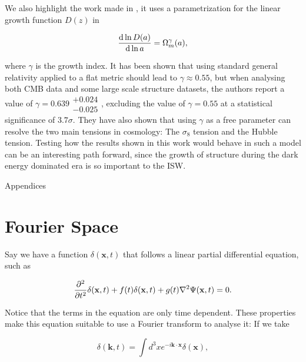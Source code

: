\documentclass[openany,a4paper,12pt,oneside]{book}
\begin{document}
\begin{spacing}{1.5}
We also highlight the work made in \cite{	growth_constraint}, it uses a parametrization for the linear growth function $D(z)$ in \cite{growth_model}

\begin{equation}\label{growth_func_new}
	\dv{\ln{D(a)}}{\ln{a}}=\Omega_m^\gamma (a),
\end{equation}

\noindent where $\gamma$ is the growth index. It has been shown that using standard general relativity applied to a flat metric should lead to $\gamma\approx 0.55$, but when analysing both CMB data and some large scale structure datasets, the authors report a value of $\gamma=0.639\substack{+0.024 \\ -0.025}$, excluding the value of $\gamma=0.55$ at a statistical significance of $3.7\sigma$. They have also shown that using $\gamma$ as a free parameter can resolve the two main tensions in cosmology: The $\sigma_8$ tension and the Hubble tension. Testing how the results shown in this work would behave in such a model can be an interesting path forward, since the growth of structure during the dark energy dominated era is so important to the ISW.

\appendix

\newpage

\begin{center}
\thispagestyle{empty}
\vspace*{\fill}
\Huge{Appendices}
\vspace*{\fill}
\end{center}

\iffalse %
\chapter{Fourier Space}\label{appendix:FourierSpace}

Say we have a function $\delta(\mathbf{x},t)$ that follows a linear partial differential equation, such as

\begin{equation}\label{Four_Space:example_diff_eq}
	\pdv[2]{}{t} \delta(\mathbf{x},t) +f(t)\delta(\mathbf{x},t) + g(t)\nabla^2\Psi(\mathbf{x},t)=0.
\end{equation}

Notice that the terms in the equation are only time dependent. These properties make this equation suitable to use a Fourier transform to analyse it: If we take

\begin{equation}
	\delta(\mathbf{k},t)=\int d^3x e^{-i\mathbf{k}\cdot \mathbf{x}}\delta(\mathbf{x}),
\end{equation}


\end{spacing}
\end{document}
